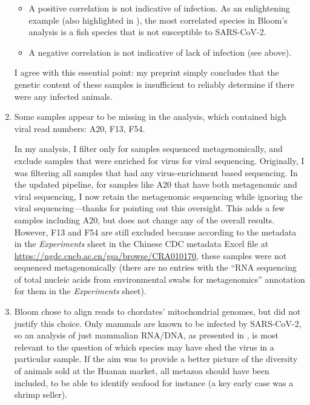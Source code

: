 \documentclass[9pt,twocolumn,twoside]{gsajnl_modified}
\begin{document}
\begin{enumerate}
\begin{itemize}
\item A positive correlation is not indicative of infection. As an enlightening example (also highlighted in \citet{crits2023genetic}), the most correlated species in Bloom’s analysis is a fish species that is not susceptible to SARS-CoV-2.

\item A negative correlation is not indicative of lack of infection (see above).

\end{itemize}

{\color{black}
I agree with this essential point: my preprint simply concludes that the genetic content of these samples is insufficient to reliably determine if there were any infected animals.
}

\item Some samples appear to be missing in the analysis, which contained high viral read numbers: A20, F13, F54.

{\color{black}
In my analysis, I filter only for samples sequenced metagenomically, and exclude samples that were enriched for virus for viral sequencing.
Originally, I was filtering all samples that had any virus-enrichment based sequencing.
In the updated pipeline, for samples like A20 that have both metagenomic and viral sequencing, I now retain the metagenomic sequencing while ignoring the viral sequencing---thanks for pointing out this oversight.
This adds a few samples including A20, but does not change any of the overall results.
However, F13 and F54 are still excluded because according to the metadata in the \textit{Experiments} sheet in the Chinese CDC metadata Excel file at \url{https://ngdc.cncb.ac.cn/gsa/browse/CRA010170}, these samples were not sequenced metagenomically (there are no entries with the ``RNA sequencing of total nucleic acids from environmental swabs for metagenomics'' annotation for them in the \textit{Experiments} sheet).
}

\item Bloom chose to align reads to chordates’ mitochondrial genomes, but did not justify this choice.
Only mammals are known to be infected by SARS-CoV-2, so an analysis of just mammalian RNA/DNA, as presented in \citet{crits2023genetic}, is most relevant to the question of which species may have shed the virus in a particular sample. If the aim was to provide a better picture of the diversity of animals sold at the Huanan market, all metazoa should have been included, to be able to identify seafood for instance (a key early case was a shrimp seller).


\end{enumerate}
\end{document}
